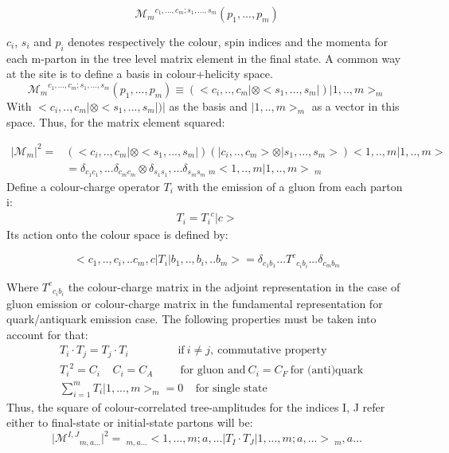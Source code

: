 \begin{equation}
{\mathcal{M}_m}^{c_1,...,c_m;s_1,...,s_m}(p_1,..., p_m)
\end{equation}

$ c_i $, $ s_i $ and $ p_i $ denotes respectively the colour, spin indices and the momenta for each m-parton in the tree level matrix element in the final state.
A common way at the site is to define a basis in colour+helicity space.
\begin{equation}
{\mathcal{M}_m}^{c_1,...,c_m;s_1,...,s_m}(p_1,..., p_m)\equiv(<c_i,..,c_m|\otimes <s_1,...,s_m|)|1,..,m>_m
\end{equation}
With $ <c_i,..,c_m|\otimes <s_1,...,s_m|)| $ as the basis and $ |1,..,m>_m $ as a vector in this space.
Thus, for the matrix element squared:

\begin{equation}
\begin{split}
\vert \mathcal{M}_m \vert^2=& (< c_i,..,c_m | \otimes < s_1,...,s_m|)(| c_i,..,c_m > \otimes | s_1,...,s_m >) < 1,..,m | 1,..,m > \\
&=\delta_{c_1 c_1},...\delta_{c_m c_m} \otimes \delta_{s_1 s_1},...\delta_{s_ms_m} \:_m < 1,..,m | 1,..,m > \:_m
\end{split}
\end{equation}
Define a colour-charge operator  $ {T_i} $ with the
emission of a gluon from each parton i:
\begin{equation}
\begin{split}
T_i = {T_i}^c |c>
\end{split}
\end{equation}
Its action onto the colour space is defined by:

\begin{equation}
<c_1,..,c_i,..c_m,c|T_i|b_1,..,b_i,..b_m>=\delta_{c_1b_1}...{T^c}_{c_ib_i}
...\delta_{c_mb_m}
\end{equation}

Where $ {T^c}_{c_ib_i} $ the colour-charge matrix in the adjoint representation in the case of gluon emission or colour-charge matrix in the fundamental representation for quark/antiquark emission case. The following properties must be taken into account for that:
\begin{equation}
\begin{split}
&T_i \cdot T_j = T_j \cdot T_i \:\:\:\:\:\:\:\:\:\:\:\:\:\:\:\:\:\:\:\:\text{if}\:i\neq j,\: \text{commutative property}\\
& {T_i}^2 = C_i\:\:\:\:\:C_i = C_A \:\:\:\:\:\:\:\:\:\:\:\text{for gluon and} \: C_i = C_F\:\text{for (anti)quark}\\
&\sum_{i=1}^m T_i |1,...,m>_m =0 \:\:\:\:\:\text{for single state}
\end{split}
\end{equation}
Thus, the square of colour-correlated tree-amplitudes for the indices I, J refer either to final-state or initial-state partons will be:
\begin{equation}
\vert {{\mathcal{M}}^{I,J}}_{m,a...} \vert^2=\:_{m,a...} < 1,...,m;a,... |T_I \cdot T_J | 1,...,m;a,... >\:_m,a...
\end{equation}



